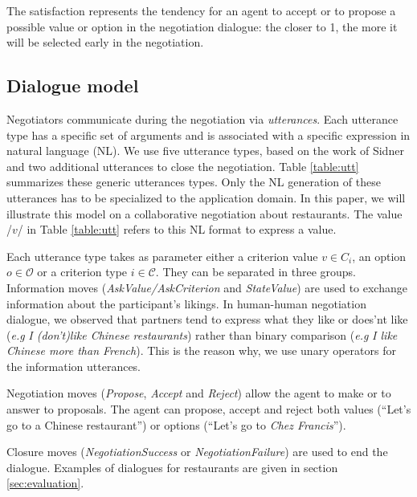 \documentclass{llncs}
\begin{document}
		\bigskip
		The satisfaction represents the tendency for an agent to accept or to propose a possible value or option in the negotiation dialogue: the closer to 1, the more it will be selected early in the negotiation.
		
		\subsection{Dialogue model}
		Negotiators communicate during the negotiation via \emph{utterances}. Each utterance type has a specific set of arguments and is associated with a specific expression in natural language (NL). We use five utterance types, based on the work of Sidner \cite{sidner1994artificial} and two additional utterances to close the negotiation. Table \ref{table:utt} summarizes these generic utterances types. Only the NL generation of these utterances has to be specialized to the application domain. In this paper, we will illustrate this model on a collaborative negotiation about restaurants. The value /$v$/ in Table \ref{table:utt} refers to this NL format to express a value.

		Each utterance type takes as parameter either a criterion value $v \in C_i$, an option $o \in \mathcal{O}$ or a criterion type $i \in \mathcal{C}$. They can be separated in three groups. Information moves (\textit{AskValue/AskCriterion} and \textit{StateValue}) are used to exchange information about the participant's likings. In human-human negotiation dialogue, we observed that partners tend to express what they like or does'nt like (\emph{e.g} \textit{I (don't)like Chinese restaurants})  rather than binary comparison (\emph{e.g} \textit{I like Chinese more than French}). This is the reason why, we use unary operators for the information utterances.
		
		Negotiation moves (\textit{Propose}, \textit{Accept} and \textit{Reject}) allow the agent to make or to answer to proposals. The agent can propose, accept and reject both values (``Let's go to a Chinese restaurant'') or options (``Let's go to \emph{Chez Francis}'').
		
		Closure moves (\textit{NegotiationSuccess} or \textit{NegotiationFailure}) are used to end the dialogue.
		Examples of dialogues for restaurants are given in section \ref{sec:evaluation}.
		
\end{document}
